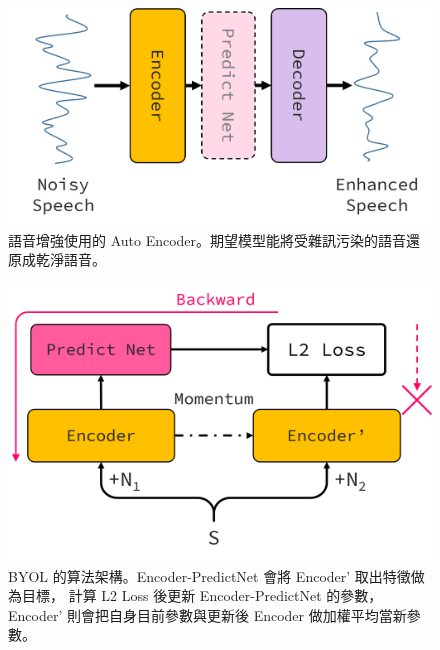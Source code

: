 \documentclass[10pt,twocolumn,letterpaper]{article}
\begin{document}
\begin{CJK}{UTF8}{bkai}
   \begin{figure}[t]
      \begin{center}
         \includegraphics[width=1\linewidth]{img/auto-encoder.png}
      \end{center}
      \caption{語音增強使用的 Auto Encoder。期望模型能將受雜訊污染的語音還原成乾淨語音。\label{fig:auto-encode}}
   \end{figure}

   \begin{figure}[t]
      \begin{center}
         \includegraphics[width=1\linewidth]{img/BYOL.png}
      \end{center}
      \caption{BYOL 的算法架構。Encoder-PredictNet 會將 Encoder' 取出特徵做為目標，
         計算 L2 Loss 後更新 Encoder-PredictNet 的參數，
         Encoder' 則會把自身目前參數與更新後 Encoder 做加權平均當新參數。\label{fig:BYOL}}
   \end{figure}


\end{CJK}
\end{document}
